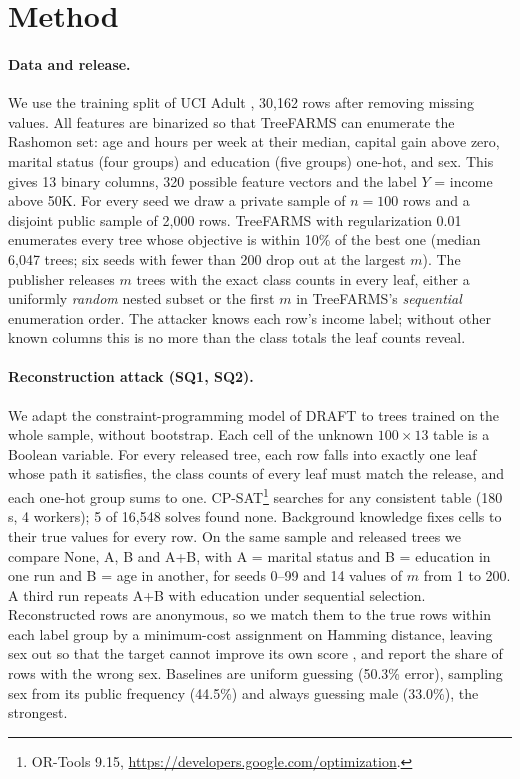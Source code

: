 \section{Method}

\paragraph{Data and release.} We use the training split of UCI Adult \citep{becker1996adult}, 30,162 rows after removing missing values. All features are binarized so that TreeFARMS can enumerate the Rashomon set: age and hours per week at their median, capital gain above zero, marital status (four groups) and education (five groups) one-hot, and sex. This gives 13 binary columns, 320 possible feature vectors and the label $Y$ = income above 50K. For every seed we draw a private sample of $n=100$ rows and a disjoint public sample of 2,000 rows. TreeFARMS \citep{xin2022treefarms} with regularization 0.01 enumerates every tree whose objective is within 10\% of the best one (median 6,047 trees; six seeds with fewer than 200 drop out at the largest $m$). The publisher releases $m$ trees with the exact class counts in every leaf, either a uniformly \emph{random} nested subset or the first $m$ in TreeFARMS's \emph{sequential} enumeration order. The attacker knows each row's income label; without other known columns this is no more than the class totals the leaf counts reveal.

\paragraph{Reconstruction attack (SQ1, SQ2).} We adapt the constraint-programming model of DRAFT \citep{ferry2024draft} to trees trained on the whole sample, without bootstrap. Each cell of the unknown $100\times13$ table is a Boolean variable. For every released tree, each row falls into exactly one leaf whose path it satisfies, the class counts of every leaf must match the release, and each one-hot group sums to one. CP-SAT\footnote{OR-Tools 9.15, \url{https://developers.google.com/optimization}.} searches for any consistent table (180\,s, 4 workers); 5 of 16,548 solves found none. Background knowledge fixes cells to their true values for every row. On the same sample and released trees we compare None, A, B and A+B, with A = marital status and B = education in one run and B = age in another, for seeds 0--99 and 14 values of $m$ from 1 to 200. A third run repeats A+B with education under sequential selection. Reconstructed rows are anonymous, so we match them to the true rows within each label group by a minimum-cost assignment on Hamming distance, leaving sex out so that the target cannot improve its own score \citep{wen2025reconstruction}, and report the share of rows with the wrong sex. Baselines are uniform guessing (50.3\% error), sampling sex from its public frequency (44.5\%) and always guessing male (33.0\%), the strongest.

